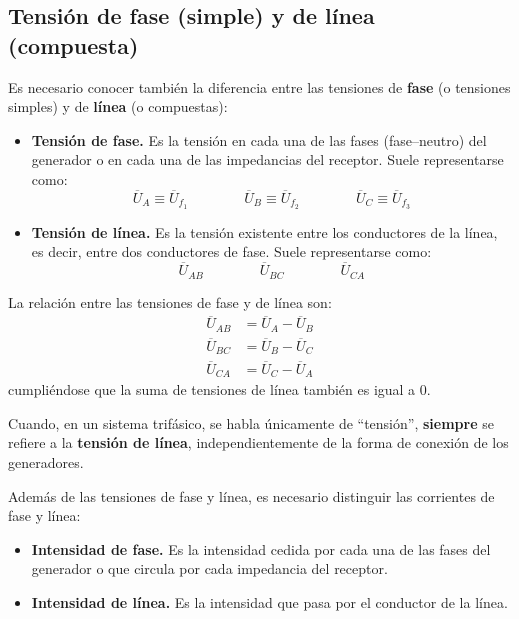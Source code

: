 	\subsection{Tensión de fase (simple) y de línea (compuesta)}\label{sec.fase_linea}
	Es necesario conocer también la diferencia entre las tensiones de \textbf{fase} (o tensiones simples) y de \textbf{línea} (o compuestas):
	\begin{itemize}
		\item \textbf{Tensión de fase.} Es la tensión en cada una de las fases (fase--neutro) del generador o en cada una de las impedancias del receptor. Suele representarse como: 
		\begin{equation*}
			\overline{U}_A\equiv \overline{U}_{f_1} \qquad \qquad \overline{U}_B\equiv \overline{U}_{f_2} \qquad \qquad \overline{U}_C \equiv \overline{U}_{f_3} 
		\end{equation*}
		\item \textbf{Tensión de línea.} Es la tensión existente entre los conductores de la línea, es decir, entre dos conductores de fase. Suele representarse como: 
		\begin{equation*}
			\overline{U}_{AB} \qquad \qquad \overline{U}_{BC} \qquad \qquad \overline{U}_{CA} 
		\end{equation*}
	\end{itemize}
	La relación entre las tensiones de fase y de línea son: 
	\begin{align}\label{eq.tensionFL}
		\overline{U}_{AB} &= \overline{U}_A - \overline{U}_B\\
		\overline{U}_{BC} &= \overline{U}_B - \overline{U}_C\\
		\overline{U}_{CA} &= \overline{U}_C - \overline{U}_A
	\end{align}
	cumpliéndose que la suma de tensiones de línea también es igual a 0. 
	\begin{remark}
	    Cuando, en un sistema trifásico, se habla únicamente de ``tensión'', \textbf{siempre} se refiere a la \textbf{tensión de línea}, independientemente de la forma de conexión de los generadores.
	\end{remark}
	
	Además de las tensiones de fase y línea, es necesario distinguir las corrientes de fase y línea:
	\begin{itemize}
		\item \textbf{Intensidad de fase.} Es la intensidad cedida por cada una de las fases del generador o que circula por cada impedancia del receptor. 
		\item \textbf{Intensidad de línea.} Es la intensidad que pasa por el conductor de la línea. 
	\end{itemize}
	
